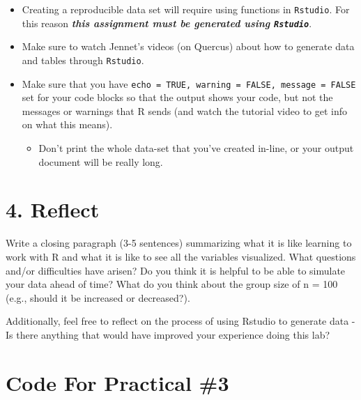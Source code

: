 \documentclass[
]{book}
\newenvironment{Shaded}{\begin{snugshade}}{\end{snugshade}}
\newcommand{\AttributeTok}[1]{\textcolor[rgb]{0.13,0.29,0.53}{#1}}
\newcommand{\CommentTok}[1]{\textcolor[rgb]{0.56,0.35,0.01}{\textit{#1}}}
\newcommand{\ConstantTok}[1]{\textcolor[rgb]{0.56,0.35,0.01}{#1}}
\newcommand{\FunctionTok}[1]{\textcolor[rgb]{0.13,0.29,0.53}{\textbf{#1}}}
\newcommand{\NormalTok}[1]{#1}
\newcommand{\SpecialCharTok}[1]{\textcolor[rgb]{0.81,0.36,0.00}{\textbf{#1}}}
\providecommand{\tightlist}{%
  \setlength{\itemsep}{0pt}\setlength{\parskip}{0pt}}
\begin{document}
\begin{itemize}
\item
  Creating a reproducible data set will require using functions in \texttt{Rstudio}. For this reason \textbf{\emph{this assignment must be generated using \texttt{Rstudio}}}.
\item
  Make sure to watch Jennet's videos (on Quercus) about how to generate data and tables through \texttt{Rstudio}.
\item
  Make sure that you have \texttt{echo\ =\ TRUE,\ warning\ =\ FALSE,\ message\ =\ FALSE} set for your code blocks so that the output shows your code, but not the messages or warnings that R sends (and watch the tutorial video to get info on what this means).

  \begin{itemize}
  \tightlist
  \item
    Don't print the whole data-set that you've created in-line, or your output document will be really long.
  \end{itemize}
\end{itemize}

\section*{4. Reflect}\label{reflect-2}

Write a closing paragraph (3-5 sentences) summarizing what it is like learning to work with R and what it is like to see all the variables visualized. What questions and/or difficulties have arisen? Do you think it is helpful to be able to simulate your data ahead of time? What do you think about the group size of n = 100 (e.g., should it be increased or decreased?).

Additionally, feel free to reflect on the process of using Rstudio to generate data - Is there anything that would have improved your experience doing this lab?

\section*{Code For Practical \#3}\label{code-for-practical-3}

\begin{Shaded}
\end{Shaded}
\end{document}

